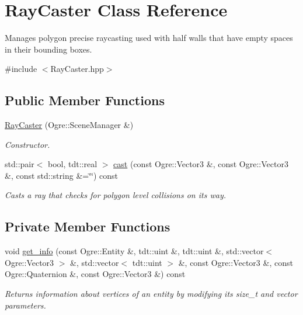 \hypertarget{class_ray_caster}{}\section{Ray\+Caster Class Reference}
\label{class_ray_caster}


Manages polygon precise raycasting used with half walls that have empty spaces in their bounding boxes.  




{\ttfamily \#include $<$Ray\+Caster.\+hpp$>$}

\subsection*{Public Member Functions}
\begin{DoxyCompactItemize}
\item 
\hyperlink{class_ray_caster_a216827ccaf7a65fc6e25953fe015d9bc}{Ray\+Caster} (Ogre\+::\+Scene\+Manager \&)
\begin{DoxyCompactList}\small\item\em Constructor. \end{DoxyCompactList}\item 
std\+::pair$<$ bool, tdt\+::real $>$ \hyperlink{class_ray_caster_a5af376ca167daa1e997a73f96bdbcbde}{cast} (const Ogre\+::\+Vector3 \&, const Ogre\+::\+Vector3 \&, const std\+::string \&=\char`\"{}\char`\"{}) const 
\begin{DoxyCompactList}\small\item\em Casts a ray that checks for polygon level collisions on it\textquotesingle{}s way. \end{DoxyCompactList}\end{DoxyCompactItemize}
\subsection*{Private Member Functions}
\begin{DoxyCompactItemize}
\item 
void \hyperlink{class_ray_caster_a6c098462b63c0cdac3cc1a3ea4609bfb}{get\+\_\+info} (const Ogre\+::\+Entity \&, tdt\+::uint \&, tdt\+::uint \&, std\+::vector$<$ Ogre\+::\+Vector3 $>$ \&, std\+::vector$<$ tdt\+::uint $>$ \&, const Ogre\+::\+Vector3 \&, const Ogre\+::\+Quaternion \&, const Ogre\+::\+Vector3 \&) const 
\begin{DoxyCompactList}\small\item\em Returns information about vertices of an entity by modifying it\textquotesingle{}s size\+\_\+t and vector parameters. \end{DoxyCompactList}\end{DoxyCompactItemize}
